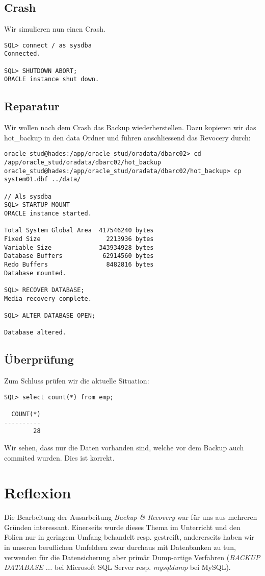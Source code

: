 \documentclass[11pt,a4paper,parskip=half]{scrartcl}
\begin{document}
\subsection{Crash}
Wir simulieren nun einen Crash.

\begin{lstlisting}
SQL> connect / as sysdba
Connected.

SQL> SHUTDOWN ABORT;
ORACLE instance shut down.
\end{lstlisting}

\subsection{Reparatur}
Wir wollen nach dem Crash das Backup wiederherstellen. Dazu kopieren wir das hot\_backup in den data Ordner und führen anschliessend das Revocery durch:
\begin{lstlisting}
oracle_stud@hades:/app/oracle_stud/oradata/dbarc02> cd /app/oracle_stud/oradata/dbarc02/hot_backup
oracle_stud@hades:/app/oracle_stud/oradata/dbarc02/hot_backup> cp system01.dbf ../data/

// Als sysdba
SQL> STARTUP MOUNT
ORACLE instance started.

Total System Global Area  417546240 bytes
Fixed Size                  2213936 bytes
Variable Size             343934928 bytes
Database Buffers           62914560 bytes
Redo Buffers                8482816 bytes
Database mounted.

SQL> RECOVER DATABASE;
Media recovery complete.

SQL> ALTER DATABASE OPEN;

Database altered.
\end{lstlisting}
\subsection{Überprüfung}
Zum Schluss prüfen wir die aktuelle Situation:

\begin{lstlisting}
SQL> select count(*) from emp;

  COUNT(*)
----------
        28
\end{lstlisting}

Wir sehen, dass nur die Daten vorhanden sind, welche vor dem Backup auch commited wurden. Dies ist korrekt.

\newpage
\section{Reflexion}
Die Bearbeitung der Ausarbeitung \emph{Backup \& Recovery} war für uns aus mehreren Gründen interessant. Einerseits wurde dieses Thema im Unterricht und den Folien nur in geringem Umfang behandelt resp. gestreift, andererseits haben wir in unseren beruflichen Umfeldern zwar durchaus mit Datenbanken zu tun, verwenden für die Datensicherung aber primär \glqq{}Dump-artige\grqq{} Verfahren (\emph{BACKUP DATABASE ...} bei Microsoft SQL Server resp. \emph{mysqldump} bei MySQL).
\end{document}
